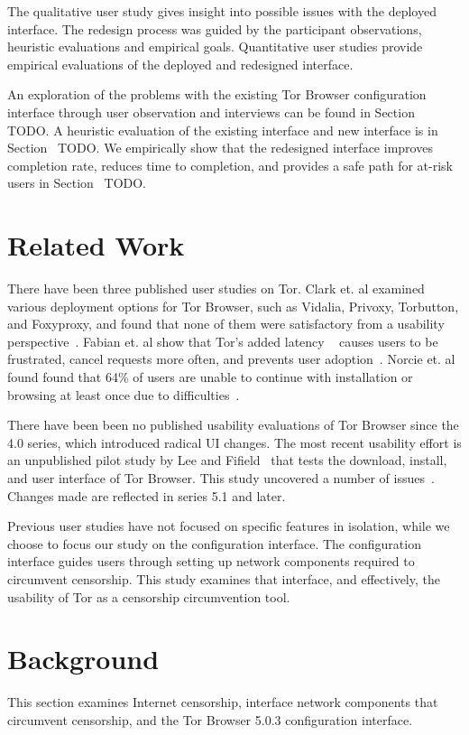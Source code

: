 \documentclass[USenglish,oneside,twocolumn]{article}
\begin{document}
The qualitative user study gives insight into possible issues with
the deployed interface. 
The redesign process was guided by the participant observations, 
heuristic evaluations and empirical goals. 
Quantitative user studies provide empirical evaluations of the deployed
and redesigned interface. 

An exploration of the problems with the existing Tor Browser 
configuration interface through user observation and interviews can be 
found in Section~{\color{red} TODO}. A heuristic evaluation of the existing interface and new interface is in Section~{\color{red} TODO}. We empirically show 
that the redesigned interface improves completion rate, reduces time to completion, 
and provides a safe path for at-risk users in Section~{\color{red} TODO}. 

\section{Related Work} 
There have been three published user studies on Tor. Clark et. al examined various deployment
options for Tor Browser, such as Vidalia, Privoxy, Torbutton, and Foxyproxy, and found that none of them 
were satisfactory from a usability perspective~\cite{clark2007usability}. Fabian et. al show that Tor's added latency 
~\cite{dingledine2009performance} causes users
to be frustrated, cancel requests more often, and prevents user adoption~\cite{fabian2010privately}. 
Norcie et. al found found that 
64\% of users are unable to continue with installation or browsing at least once due to difficulties~\cite{norcie2012eliminating}. 

There have been been no published usability evaluations of
Tor Browser since the 4.0 series, which introduced radical UI changes. 
The most recent usability effort is an unpublished pilot study  by Lee and Fifield~\cite {uxsprint} 
that tests the download, install, and  user interface of Tor Browser.  This study uncovered a number of issues~\cite{uxsprint2015-tickets}. Changes made are reflected in series 5.1 and later. 

Previous user studies have not focused on specific features in isolation, while we choose to focus our study on 
the configuration interface. The configuration interface guides users through setting up network components required to circumvent censorship. 
This study examines that interface, and effectively, the usability of Tor as a censorship circumvention tool. 

\section{Background} 
This section examines Internet censorship, interface network components that circumvent censorship, and the Tor Browser 5.0.3 configuration interface. 
\end{document}
